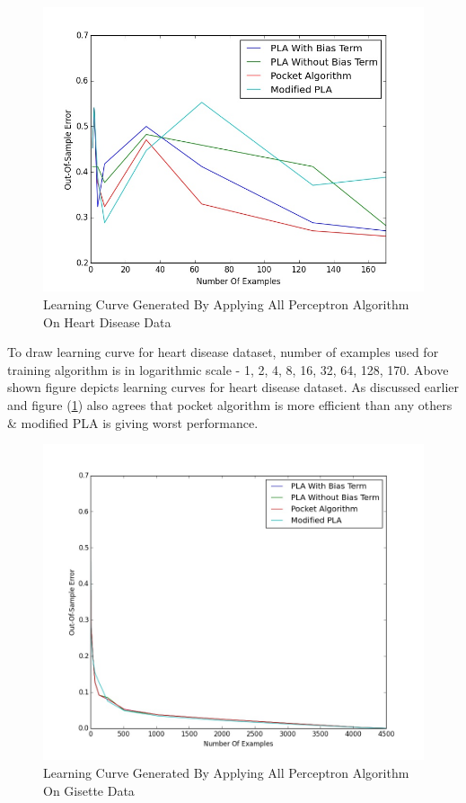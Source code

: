 \documentclass{article}
\begin{document}
\begin{figure}[H]
  \centering
    \includegraphics[width=6in]{images/LCOfAll_Heart_Data.jpeg}
   
    \caption{Learning Curve Generated By Applying All Perceptron Algorithm On Heart Disease Data }
    
    \label{1 Learning Curve}
  
\end{figure}
\par To draw learning curve for heart disease dataset, number of examples used for training algorithm is in logarithmic scale - 1, 2, 4, 8, 16, 32, 64, 128, 170. Above shown figure depicts learning curves for heart disease dataset. As discussed earlier and figure (\ref{1 Learning Curve}) also agrees that pocket algorithm is more efficient than any others \& modified PLA is giving worst performance. 
\begin{figure}[H]
  \centering
    \includegraphics[width=6in]{images/LCOfAll_Gisette_Data.jpeg}
   
    \caption{Learning Curve Generated By Applying All Perceptron Algorithm On Gisette Data }
    
    \label{1.1 Learning Curve}
  
\end{figure}
\end{document}
